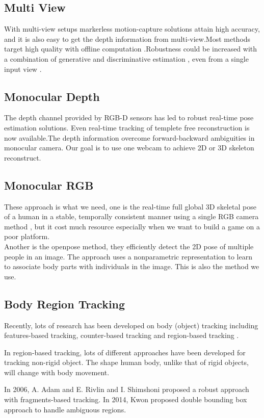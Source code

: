 \documentclass[11pt,twocolumn,letterpaper]{article}
\begin{document}
  \subsection{Multi View}
  With multi-view setups markerless motion-capture solutions attain high accuracy, and it is also easy to get the depth information from multi-view.Most methods target high quality with offline computation \cite{Loper2014}\cite{twist}.Robustness could be increased with a combination of generative and discriminative estimation \cite{7299005}, even from a single input view \cite{Rosales2006}.
  \subsection{Monocular Depth}
  The depth channel provided by RGB-D sensors has led to robust real-time pose estimation solutions\cite{6126356}\cite{7457693}. Even real-time tracking of templete free reconstruction is now available\cite{Dou:2016:FRP:2897824.2925969}.The depth information overcome forward-backward  ambiguities in monocular camera. Our goal is to use one webcam to achieve 2D or 3D skeleton reconstruct.
  \subsection{Monocular RGB}
  These approach is what we need, one is the real-time  full global 3D skeletal pose of a human in a stable, temporally consistent manner using a single RGB camera method \cite{VNect_SIGGRAPH2017}, but it cost much resource especially when we want to build a game on a poor platform.\\
  Another is the openpose method\cite{cao2017realtime}\cite{wei2016cpm}, they efficiently detect the 2D pose of multiple people in an image. The approach uses a nonparametric representation to learn to associate body parts with individuals in the image. This is also the method we use.
  \subsection{Body Region Tracking}
  Recently, lots of research has been developed on body (object) tracking including features-based tracking, counter-based tracking \cite{panin2006efficient} and region-based tracking \cite{1640835}.
  \par
  In region-based tracking, lots of different approaches have been developed for tracking non-rigid object. The shape human body, unlike that of rigid objects, will change with body movement.
  \par
  In 2006, A. Adam and E. Rivlin and I. Shimshoni proposed a robust approach with fragments-based tracking. In 2014, Kwon proposed double bounding box approach to handle ambiguous regions. \cite{Kwon2014}
\end{document}
